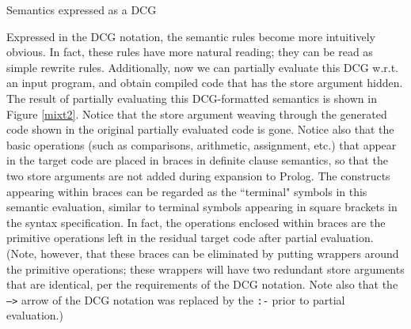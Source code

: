 \documentclass{entcs}
\begin{document}
\centerline{Semantics expressed as a DCG}

\medskip

Expressed in the DCG notation, the semantic rules 
 become more intuitively
obvious. In fact, these rules
have more natural reading; they can be read as
simple rewrite rules.  Additionally, now
we can partially evaluate this DCG w.r.t. an
input program, and obtain compiled code that
has the store argument hidden. 
The result of partially evaluating this DCG-formatted semantics 
is shown in Figure \ref{mixt2}.
Notice that the store argument weaving through the
generated code shown in the original partially evaluated code is gone.
Notice also that the basic operations (such as comparisons,
arithmetic, assignment, etc.) that appear in the target
code are placed in braces in definite clause semantics,
so that the two store arguments are not
added during expansion to Prolog. 
The constructs
appearing within braces can be regarded as the ``terminal"
symbols in this semantic evaluation, similar to terminal
symbols appearing in square brackets in the syntax specification. In fact,
the operations enclosed within braces are the primitive operations
left in the residual target code after partial evaluation.
(Note, however, that these braces can be eliminated by putting
wrappers around the primitive operations; these wrappers will
have two redundant store arguments that are identical, per the
requirements of the DCG notation. Note also that the {\tt -->}
arrow of the DCG notation was replaced by the {\tt :-} prior to
partial evaluation.)
\end{figwindow}
\end{document}
